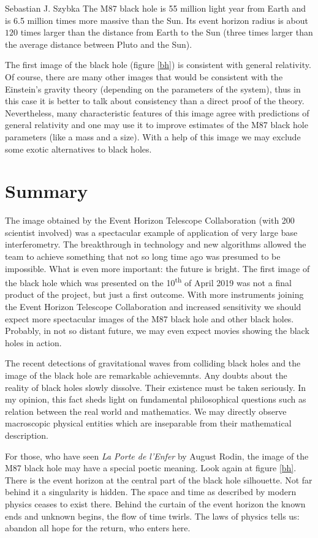 \begin{artengenv}{Sebastian J. Szybka}
 The M87 black hole is 55 million light year from Earth and is 6.5 million times more massive than the Sun. Its event horizon radius is about $120$ times larger than the distance from Earth to the Sun (three times larger than the average distance between Pluto and the Sun).

The first image of the black hole (figure \ref{bh}) is consistent with general relativity. Of course, there are many other images that would be consistent with the Einstein's gravity theory (depending on the parameters of the system), thus in this case it is better to talk about consistency than a direct proof of the theory. Nevertheless, many characteristic features of this image agree with predictions of general relativity and one may use it to improve estimates of the M87 black hole parameters (like a mass and a size). With a help of this image we may exclude some exotic alternatives to black holes. 

\section{Summary}

The image obtained by the Event Horizon Telescope Collaboration (with 200 scientist involved) was a spectacular example of application of very large base interferometry. The breakthrough in technology and new algorithms allowed the team to achieve something that not so long time ago was presumed to be impossible. What is even more important: the future is bright. The first image of the black hole which was presented on the 10\textsuperscript{th} of April 2019 was not a final product of the project, but just a first outcome. With more instruments joining the Event Horizon Telescope Collaboration and increased sensitivity we should expect more spectacular images of the M87 black hole and other black holes. Probably, in not so distant future, we may even expect  movies showing the black holes in action. 

The recent detections of gravitational waves from colliding black holes and the image of the black hole are remarkable achievemnts. Any doubts about the reality of black holes slowly dissolve. Their existence must be taken seriously. In my opinion, this fact sheds light on fundamental philosophical questions such as relation between the real world and mathematics. We may directly observe macroscopic physical entities which are inseparable from their mathematical description. 

For those, who have seen \textit{La Porte de l'Enfer} by August Rodin, the image of the M87 black hole may have a special poetic meaning. Look again at figure \ref{bh}. There is the event horizon at the central part of the black hole silhouette. Not far behind it a singularity is hidden. The space and time as described by modern physics ceases to exist there. Behind the curtain of the event horizon the known ends and unknown begins, the flow of time twirls. The laws of physics tells us: abandon all hope for the return, who enters here.

\end{artengenv}